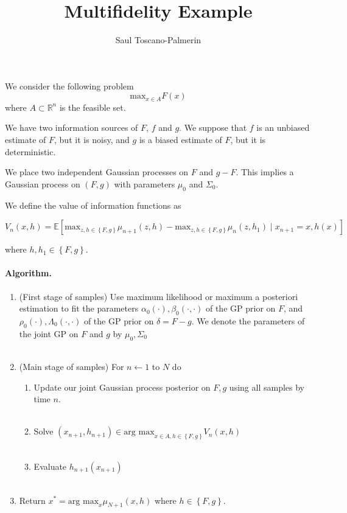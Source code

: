 \documentclass[12pt,english]{article}
\author{Saul Toscano-Palmerin}
\date{}
\begin{document}
\title{Multifidelity Example}

\maketitle
We consider the following problem
\[
\mbox{max}_{x\in A}F\left(x\right)
\]
where $A\subset\mathbb{R}^{n}$ is the feasible set.

We have two information sources of $F$, $f$ and $g$. We suppose that $f$
is an unbiased estimate of $F$, but it is noisy, and $g$ is a biased
estimate of $F$, but it is deterministic.

We place two independent Gaussian processes on $F$ and $g-F$. This implies a Gaussian process
on $(F,g)$ with parameters $\mu_{0}$ and $\Sigma_{0}$.

We define the value of information functions as

\[
V_{n}\left(x,h\right)=\mathbb{E}\left[\mbox{max}_{z,h\in\left\{ F,g\right\}}\mu_{n+1}\left(z,h\right)-\mbox{max}_{z,h\in\left\{ F,g\right\}}\mu_{n}\left(z,h_{1}\right)\mid x_{n+1}=x,h\left(x\right)\right]
\]

where $h,h_{1}\in\left\{ F,g\right\} $.


\paragraph{Algorithm.}

\begin{enumerate}
\item (First stage of samples) Use maximum likelihood or maximum a posteriori estimation to fit the
parameters $\alpha_{0}\left(\cdot\right),\beta_{0}\left(\cdot,\cdot\right)$
of the GP prior on $F$, and $\rho_{0}\left(\cdot\right),\Lambda_{0}\left(\cdot,\cdot\right)$
of the GP prior on $\delta=F-g$. We denote the parameters of the joint GP on $F$ and $g$ by
$\mu_{0},\Sigma_{0}$\\
 \textrm{}\\
\item (Main stage of samples) For $n\leftarrow1$ to $N$ do
\begin{enumerate}
    \item Update our joint Gaussian process posterior on $F,g$ using all samples by time $n$.\\
    \textrm{}\\
\item Solve $\left(x_{n+1},h_{n+1}\right)\in\mbox{arg max}_{x\in A,h\in\left\{ F,g\right\} }V_{n}\left(x,h\right)$\\
\textrm{}\\
\item Evaluate $h_{n+1}\left(x_{n+1}\right)$\\
\textrm{}\\
\end{enumerate}
\item Return $x^{*}=\mbox{arg max}_{x}\mu_{N+1}\left(x,h\right)$ where $h\in\left\{ F,g\right\}$.
\end{enumerate}
\end{document}
